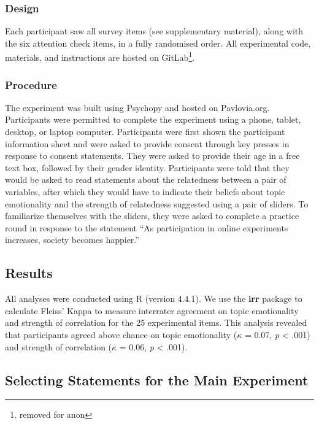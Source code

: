 \documentclass[manuscript,screen,review,anonymous]{acmart}
\begin{document}
\subsubsection{Design}\label{sec-design-pre}

Each participant saw all survey items (see supplementary material),
along with the six attention check items, in a fully randomised order.
All experimental code, materials, and instructions are hosted on
GitLab\footnote{removed for anon}.

\subsubsection{Procedure}\label{sec-procedure-pre}

The experiment was built using Psychopy \citep{pierce_2019} and hosted
on Pavlovia.org. Participants were permitted to complete the experiment
using a phone, tablet, desktop, or laptop computer. Participants were
first shown the participant information sheet and were asked to provide
consent through key presses in response to consent statements. They were
asked to provide their age in a free text box, followed by their gender
identity. Participants were told that they would be asked to read
statements about the relatedness between a pair of variables, after
which they would have to indicate their beliefs about topic emotionality
and the strength of relatedness suggested using a pair of sliders. To
familiarize themselves with the sliders, they were asked to complete a
practice round in response to the statement ``As participation in online
experiments increases, society becomes happier.''

\subsection{Results}\label{sec-results-pre}

All analyses were conducted using R (version 4.4.1). We use the
\textbf{irr} package to calculate Fleiss' Kappa to measure interrater
agreement on topic emotionality and strength of correlation for the 25
experimental items. This analysis revealed that participants agreed
above chance on topic emotionality (\(\kappa\) = 0.07, \emph{p}
\textless{} .001) and strength of correlation (\(\kappa\) = 0.06,
\emph{p} \textless{} .001).

\subsection{Selecting Statements for the Main
Experiment}\label{sec-selecting-statements}
\end{document}
